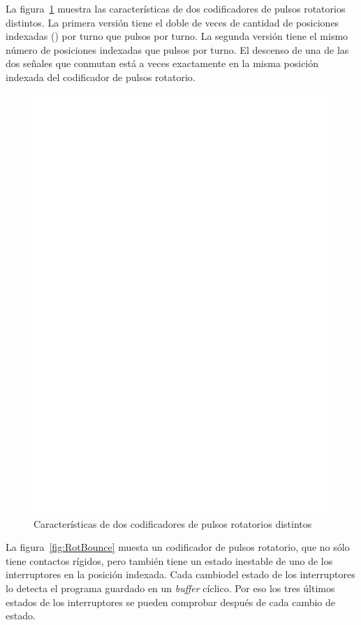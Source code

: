 La figura~\ref{fig:RotEnc} muestra las características de dos  codificadores de pulsos rotatorios distintos. La primera
versión tiene  el doble  de veces  de cantidad de  posiciones indexadas  (\textit{\color{red}{detents}}) por  turno que
pulsos por turno. La segunda  versión tiene el mismo número de posiciones indexadas que  pulsos por turno. El descenso
de una  de las dos señales  que conmutan está a  veces exactamente en la  misma posición indexada del  codificador de
pulsos rotatorio.

\begin{figure}[H]
\centering
\includegraphics[width=14cm]{../FIG/rotary_encoder.eps}
\caption{Características de dos  codificadores de pulsos rotatorios distintos}
\label{fig:RotEnc}
\end{figure}

La figura~\ref{fig:RotBounce}  muesta un codificador de  pulsos rotatorio, que  no sólo tiene contactos  rígidos, pero
también tiene un  estado inestable de uno de los  interruptores en la posición indexada. Cada  cambiodel estado de los
interruptores lo detecta el programa  guardado en un \textit{buffer} cíclico. Por eso los  tres últimos estados de los
interruptores se pueden comprobar después de cada cambio de estado.

